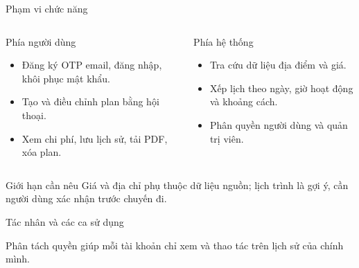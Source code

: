 \documentclass[aspectratio=169,11pt]{beamer}
\begin{document}
\begin{frame}{Phạm vi chức năng}
  \begin{columns}[T,onlytextwidth]
      \begin{block}{Phía người dùng}
        \begin{itemize}
          \item Đăng ký OTP email, đăng nhập, khôi phục mật khẩu.
          \item Tạo và điều chỉnh plan bằng hội thoại.
          \item Xem chi phí, lưu lịch sử, tải PDF, xóa plan.
        \end{itemize}
      \end{block}
      \begin{block}{Phía hệ thống}
        \begin{itemize}
          \item Tra cứu dữ liệu địa điểm và giá.
          \item Xếp lịch theo ngày, giờ hoạt động và khoảng cách.
          \item Phân quyền người dùng và quản trị viên.
        \end{itemize}
      \end{block}
  \end{columns}
  \begin{alertblock}{Giới hạn cần nêu}
    Giá và địa chỉ phụ thuộc dữ liệu nguồn; lịch trình là gợi ý, cần người dùng xác nhận trước chuyến đi.
  \end{alertblock}
\end{frame}

\begin{frame}{Tác nhân và các ca sử dụng}
  \centering
  \vspace{0.35cm}
  \begin{center}\small
    Phân tách quyền giúp mỗi tài khoản chỉ xem và thao tác trên lịch sử của chính mình.
  \end{center}
\end{frame}
\end{document}
